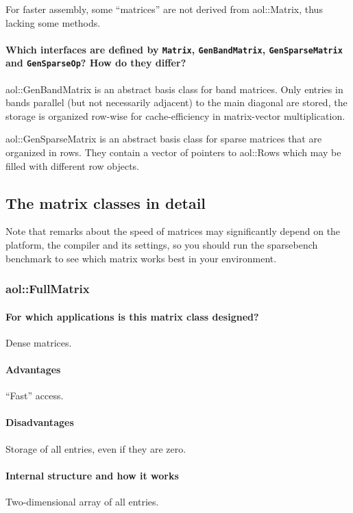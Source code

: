 For faster assembly, some ``matrices'' are not derived from
aol::Matrix, thus lacking some methods.

\paragraph{Which interfaces are defined by \texttt{Matrix},
\texttt{GenBandMatrix}, \texttt{GenSparseMatrix} and \texttt{GenSparseOp}? How do they differ?}
aol::GenBandMatrix is an abstract basis class for band matrices. Only
entries in bands parallel (but not necessarily adjacent) to the main
diagonal are stored, the storage is organized row-wise for
cache-efficiency in matrix-vector multiplication.

aol::GenSparseMatrix is an abstract basis class for sparse matrices
that are organized in rows. They contain a vector of pointers to
aol::Rows which may be filled with different row objects.

\subsection{The matrix classes in detail}
Note that remarks about the speed of matrices may significantly depend
on the platform, the compiler and its settings, so you should run the
sparsebench benchmark to see which matrix works best in your
environment.

\subsubsection{aol::FullMatrix}
\paragraph{For which applications is this matrix class designed?}
Dense matrices.

\paragraph{Advantages}
``Fast'' access.

\paragraph{Disadvantages}
Storage of all entries, even if they are zero.

\paragraph{Internal structure and how it works}
Two-dimensional array of all entries.


